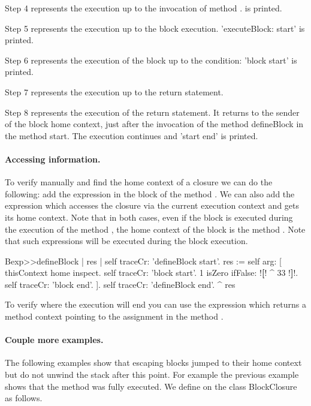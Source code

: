 \documentclass[a4paper,10pt,twoside]{book}
\begin{document}
Step 4 represents the execution up to the invocation of method .  is printed.

Step 5 represents the execution up to the block execution. 'executeBlock: start' is printed.

Step 6 represents the execution of the block up to the condition: 'block start' is printed.

Step 7 represents the execution up to the return statement.

Step 8 represents the execution of the return statement. It returns to the sender of the block home context, \ie just after the invocation of the method defineBlock in the method start. The execution continues and 'start end' is printed.




\paragraph{Accessing information.} 
To verify manually and find the home context of a closure we can do the following: add the expression  in the block of the  method . We can also add the expression  which accesses the closure via the current execution context and gets its home context. Note that in both cases, even if the block is executed during the execution of the method , the home context of the block is the method .
Note that such expressions will be executed during the block execution.

\begin{code}{}
Bexp>>defineBlock
	| res |
	self traceCr: 'defineBlock start'.
	res := self arg: [ thisContext home inspect. self traceCr: 'block start'.
                            1 isZero ifFalse: !\textbf{[}! ^ 33 !\textbf{]}!.
                            self traceCr: 'block end'. ].
	self traceCr: 'defineBlock end'.
	^ res
\end{code}

To verify where the execution will end you can use the expression  which returns a method context pointing to the assignment in the method .

\paragraph{Couple more examples.}
The following examples show that escaping blocks jumped to their home context but do not unwind the stack after this point. For example the previous example shows that the method  was fully executed.
We define  on the class BlockClosure as follows.
\end{document}
